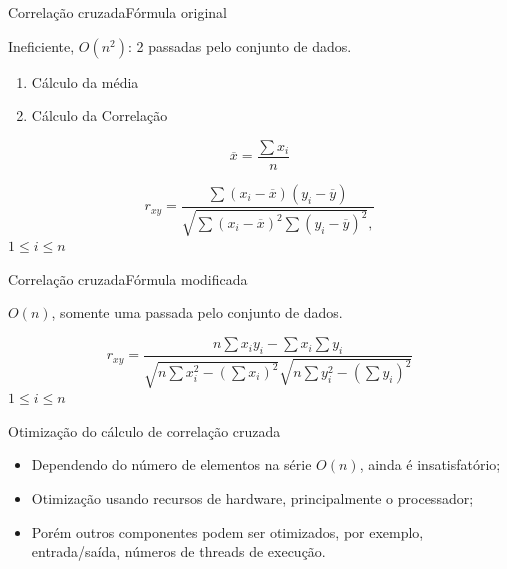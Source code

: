 \documentclass[]{beamer}
\begin{document}
\begin{frame}{Correlação cruzada}{Fórmula original}

Ineficiente, $O(n^2)$: 2 passadas pelo conjunto de dados.

\begin{enumerate}
  \item Cálculo da média
  \item Cálculo da Correlação
\end{enumerate}

\begin{equation}
  \overline{x} = \frac{\sum{x_i}}{n}
\end{equation}

\begin{equation}
  r_{xy}= 
  \frac{
    \sum
    (x_i-\overline{x})(y_i- \overline{y})
  }{
    \sqrt{\sum (x_i-\overline{x})^2
      \sum (y_i-\overline{y})^2},
  }  
\label{a}
\end{equation}
{\footnotesize $1\leq i\leq n$}
\end{frame}

\begin{frame}{Correlação cruzada}{Fórmula modificada}

$O(n)$, somente uma passada pelo conjunto de dados.

\begin{equation}
  r_{xy} = 
    \frac{
      n\sum x_iy_i-\sum x_i\sum y_i
    }
        {
          \sqrt{n\sum x_i^2-(\sum x_i)^2}
          \sqrt{n\sum y_i^2-(\sum y_i)^2}
        }
\end{equation}
{\footnotesize $1\leq i\leq n$}
\end{frame}

\begin{frame}{Otimização do cálculo de correlação cruzada}
  \begin{itemize}
  \item Dependendo do número de elementos na série $O(n)$, ainda é insatisfatório;
  \item Otimização usando recursos de hardware, principalmente o processador;
  \item Porém outros componentes podem ser otimizados, por exemplo,
    entrada/saída, números de threads de execução.
  \end{itemize}  
\end{frame}
\end{document}
